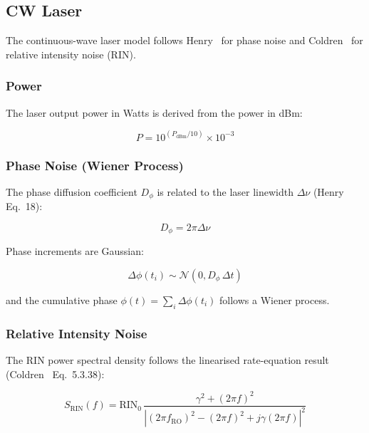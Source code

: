 \documentclass[3p,times,preprint]{elsarticle}
\begin{document}
\subsection{CW Laser}

The continuous-wave laser model follows Henry~\cite{henry} for phase noise
and Coldren~\cite{coldren} for relative intensity noise (RIN).

\subsubsection{Power}

The laser output power in Watts is derived from the power in dBm:

\begin{equation}
  P = 10^{(P_{\text{dBm}}/10)} \times 10^{-3}
\end{equation}

\subsubsection{Phase Noise (Wiener Process)}

The phase diffusion coefficient $D_\phi$ is related to the laser linewidth
$\Delta\nu$ (Henry~\cite{henry} Eq.~18):

\begin{equation}
  D_\phi = 2\pi \Delta\nu
\end{equation}

Phase increments are Gaussian:

\begin{equation}
  \Delta\phi(t_i) \sim \mathcal{N}(0, D_\phi \, \Delta t)
\end{equation}

and the cumulative phase $\phi(t) = \sum_{i} \Delta\phi(t_i)$ follows a
Wiener process.

\subsubsection{Relative Intensity Noise}

The RIN power spectral density follows the linearised rate-equation result
(Coldren~\cite{coldren} Eq.~5.3.38):

\begin{equation}
  S_{\text{RIN}}(f) = \text{RIN}_0 \,
  \frac{\gamma^2 + (2\pi f)^2}
       {|(2\pi f_{\text{RO}})^2 - (2\pi f)^2 + j\gamma(2\pi f)|^2}
  \label{eq:rin-psd}
\end{equation}
\end{document}
